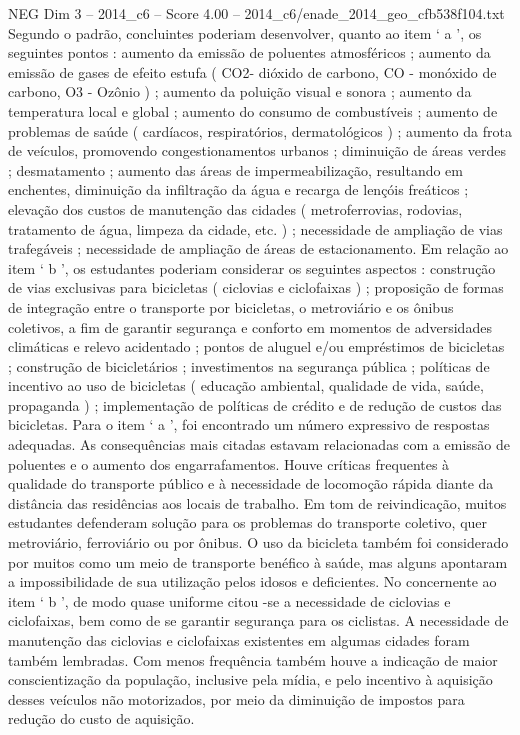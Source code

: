 \begin{textsample}{NEG Dim 3 – 2014\_c6 – Score 4.00 – 2014\_c6/enade\_2014\_geo\_cfb538f104.txt}
Segundo o padrão, concluintes poderiam desenvolver, quanto ao item ‘ a ’, os seguintes pontos : aumento da emissão de poluentes atmosféricos ; aumento da emissão de gases de efeito estufa ( CO2- dióxido de carbono, CO - monóxido de carbono, O3 - Ozônio ) ; aumento da poluição visual e sonora ; aumento da temperatura local e global ; aumento do consumo de combustíveis ; aumento de problemas de saúde ( cardíacos, respiratórios, dermatológicos ) ; aumento da frota de veículos, promovendo congestionamentos urbanos ; diminuição de áreas verdes ; desmatamento ; aumento das áreas de impermeabilização, resultando em enchentes, diminuição da infiltração da água e recarga de lençóis freáticos ; elevação dos custos de manutenção das cidades ( metroferrovias, rodovias, tratamento de água, limpeza da cidade, etc. ) ; necessidade de ampliação de vias trafegáveis ; necessidade de ampliação de áreas de estacionamento.
Em relação ao item ‘ b ’, os estudantes poderiam considerar os seguintes aspectos : construção de vias exclusivas para bicicletas ( ciclovias e ciclofaixas ) ; proposição de formas de integração entre o transporte por bicicletas, o metroviário e os ônibus coletivos, a fim de garantir segurança e conforto em momentos de adversidades climáticas e relevo acidentado ; pontos de aluguel e/ou empréstimos de bicicletas ; construção de bicicletários ; investimentos na segurança pública ; políticas de incentivo ao uso de bicicletas ( educação ambiental, qualidade de vida, saúde, propaganda ) ; implementação de políticas de crédito e de redução de custos das bicicletas.
Para o item ‘ a ’, foi encontrado um número expressivo de respostas adequadas.
As consequências mais citadas estavam relacionadas com a emissão de poluentes e o aumento dos engarrafamentos.
Houve críticas frequentes à qualidade do transporte público e à necessidade de locomoção rápida diante da distância das residências aos locais de trabalho.
Em tom de reivindicação, muitos estudantes defenderam solução para os problemas do transporte coletivo, quer metroviário, ferroviário ou por ônibus.
O uso da bicicleta também foi considerado por muitos como um meio de transporte benéfico à saúde, mas alguns apontaram a impossibilidade de sua utilização pelos idosos e deficientes.
No concernente ao item ‘ b ’, de modo quase uniforme citou -se a necessidade de ciclovias e ciclofaixas, bem como de se garantir segurança para os ciclistas.
A necessidade de manutenção das ciclovias e ciclofaixas existentes em algumas cidades foram também lembradas.
Com menos frequência também houve a indicação de maior conscientização da população, inclusive pela mídia, e pelo incentivo à aquisição desses veículos não motorizados, por meio da diminuição de impostos para redução do custo de aquisição.

\end{textsample}
